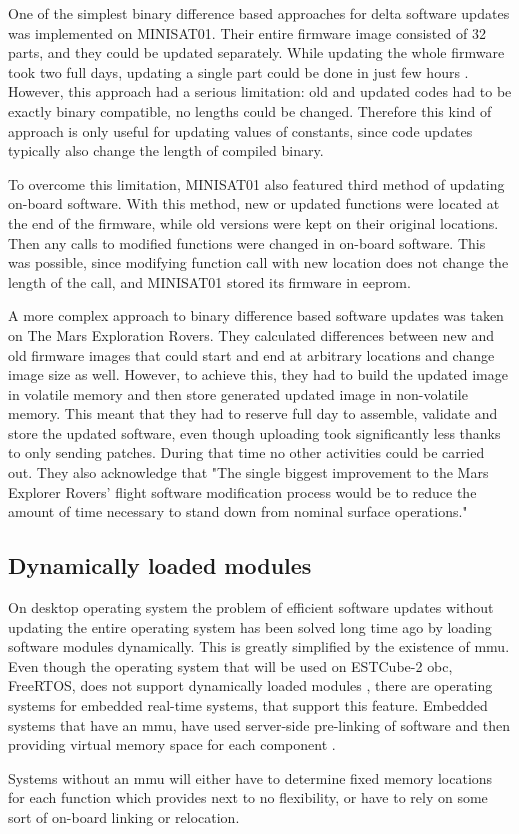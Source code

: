 
One of the simplest binary difference based approaches for delta software updates was implemented on MINISAT01. Their entire firmware image consisted of 32 parts, and they could be updated separately. While updating the whole firmware took two full days, updating a single part could be done in just few hours \cite{Garrido1998}. However, this approach had a serious limitation: old and updated codes had to be exactly binary compatible, no lengths could be changed. Therefore this kind of approach is only useful for updating values of constants, since code updates typically also change the length of compiled binary.

To overcome this limitation, MINISAT01 also featured third method of updating on-board software. With this method, new or updated functions were located at the end of the firmware, while old versions were kept on their original locations. Then any calls to modified functions were changed in on-board software. This was possible, since modifying function call with new location does not change the length of the call, and MINISAT01 stored its firmware in \gls{eeprom}. \cite{Garrido1998} 

A more complex approach to binary difference based software updates was taken on The Mars Exploration Rovers. They calculated differences between new and old firmware images that could start and end at arbitrary locations and change image size as well. However, to achieve this, they had to build the updated image in volatile memory and then store generated updated image in non-volatile memory. This meant that they had to reserve full day to assemble, validate and store the updated software, even though uploading took significantly less thanks to only sending patches. During that time no other activities could be carried out. They also acknowledge that "The single biggest improvement to the Mars Explorer Rovers' flight software modification process would be to reduce the amount of time necessary to stand down from nominal surface operations." \cite{Greco2005}

\subsection{Dynamically loaded modules}

On desktop operating system the problem of efficient software updates without updating the entire operating system has been solved long time ago by loading software modules dynamically. This is greatly simplified by the existence of \gls{mmu}. Even though the operating system that will be used on ESTCube-2 \gls{obc}, FreeRTOS, does not support dynamically loaded modules \cite{Barry2005}, there are operating systems for embedded real-time systems, that support this feature. Embedded systems that have an \gls{mmu}, have used server-side pre-linking of software and then providing virtual memory space for each component \cite{Shen2010}.

Systems without an \gls{mmu} will either have to determine fixed memory locations for each function which provides next to no flexibility, or have to rely on some sort of on-board linking or relocation. 



